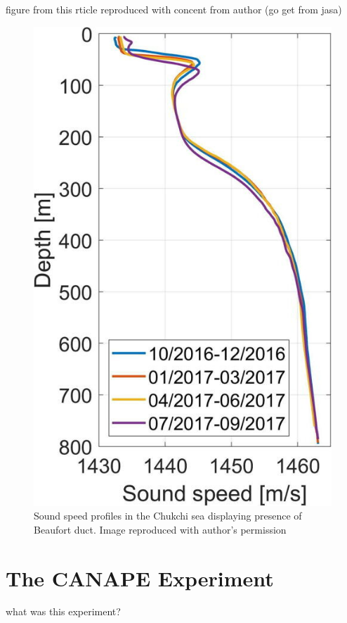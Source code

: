 figure from this rticle reproduced with concent from author (go get from jasa)
\begin{figure}[ht]
\centering
\includegraphics[scale=0.5]{Figures/ssp.jpeg}
\caption{Sound speed profiles in the Chukchi sea displaying presence of Beaufort duct. Image reproduced with author's permission}
\label{fig_ssp}
\end{figure}
\section{The CANAPE Experiment}

what was this experiment?

